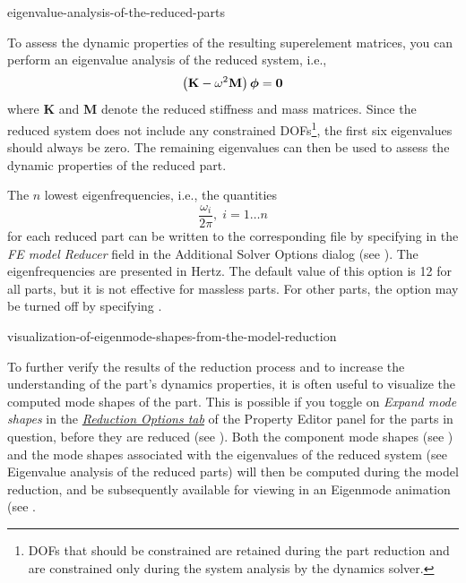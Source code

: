            {eigenvalue-analysis-of-the-reduced-parts}

To assess the dynamic properties of the resulting superelement matrices,
you can perform an eigenvalue analysis of the reduced system, i.e.,
$$\left({\bf K} - \omega^2{\bf M}\right)\mbox{\boldmath$\phi$} = {\bf 0}$$
where \textbf{K} and \textbf{M} denote the reduced stiffness and mass matrices.
Since the reduced system does not include any constrained DOFs\footnote{
DOFs that should be constrained are retained during the part reduction and are
constrained only during the system analysis by the dynamics solver.},
the first six eigenvalues should always be zero. The remaining eigenvalues
can then be used to assess the dynamic properties of the reduced part.

The $n$ lowest eigenfrequencies, i.e., the quantities
$$\frac{\omega_i}{2\pi}, \; i = 1 \ldots n $$
for each reduced part can be written to the corresponding  file
by specifying  in the {\sl FE model Reducer} field in the
Additional Solver Options dialog (see
).
The eigenfrequencies are presented in Hertz.
The default value of this option is 12 for all parts,
but it is not effective for massless parts.
For other parts, the option may be turned off by specifying .


           {visualization-of-eigenmode-shapes-from-the-model-reduction}

To further verify the results of the reduction process and to increase
the understanding of the part's dynamics properties, it is often useful
to visualize the computed mode shapes of the part.
This is possible if you toggle on {\sl Expand mode shapes} in the
\protect\hyperlink{reduction-options-tab}{\sl Reduction Options tab}
of the Property Editor panel for the parts in question, before they are reduced
(see ).
Both the component mode shapes
(see )
and the mode shapes associated with the eigenvalues of the reduced system
(see 
{Eigenvalue analysis of the reduced parts}) will then be computed during the
model reduction, and be subsequently available for viewing in an Eigenmode
animation
(see .

